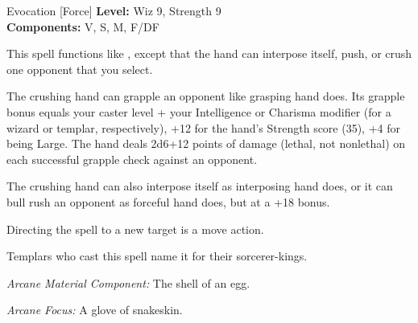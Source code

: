 {Evocation [Force]}
{
	\textbf{Level:}
	Wiz 9, Strength 9\\
	\textbf{Components:}
	V, S, M, F/DF\\
}
{
	This spell functions like , except that the hand can interpose itself, push, or crush one opponent that you select.

	The crushing hand can grapple an opponent like grasping hand does. Its grapple bonus equals your caster level + your Intelligence or Charisma modifier (for a wizard or templar, respectively), +12 for the hand's Strength score (35), +4 for being Large. The hand deals 2d6+12 points of damage (lethal, not nonlethal) on each successful grapple check against an opponent.

	The crushing hand can also interpose itself as interposing hand does, or it can bull rush an opponent as forceful hand does, but at a +18 bonus.

	Directing the spell to a new target is a move action.

	Templars who cast this spell name it for their sorcerer-kings.

	\textit{Arcane Material Component:}
	The shell of an egg.

	\textit{Arcane Focus:}
	A glove of snakeskin.

}
